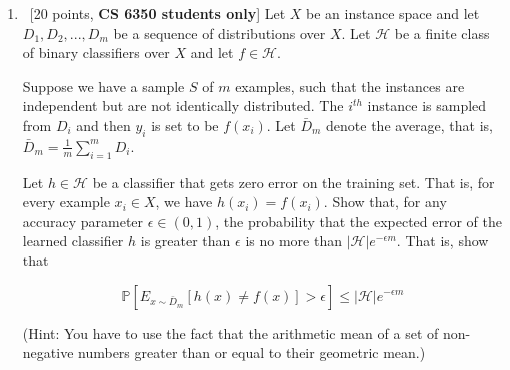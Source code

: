 \begin{enumerate}
\item ~[20 points, {\bf CS 6350 students only}] Let $X$ be an instance
  space and let $D_1,D_2,...,D_m$ be a sequence of distributions over
  $X$. Let $\mathcal{H}$ be a finite class of binary classifiers over
  $X$ and let $f\in \mathcal{H}$. 

  Suppose we have a sample $S$ of $m$ examples, such that the
  instances are independent but are not identically distributed. The
  $i^{th}$ instance is sampled from $D_i$ and then $y_i$ is set to be
  $f(x_i)$. Let $\bar{D}_m$ denote the average, that is,
  $\bar{D}_m = \frac{1}{m}\sum_{i=1}^m D_i$. 

  Let $h \in \mathcal{H}$ be a classifier that gets zero error on the
  training set. That is, for every example $x_i \in X$, we have
  $h(x_i) = f(x_i)$. Show that, for any accuracy parameter
  $\epsilon \in (0, 1)$, the probability that the expected error of
  the learned classifier $h$ is greater than $\epsilon$ is no more
  than $|\mathcal{H}|e^{-\epsilon m}$. That is, show that

  \[\mathbb{P}\left[E_{x \sim \bar{D}_m}\left[h(x) \ne f(x)\right]> \epsilon\right] \leq  |\mathcal{H}|e^{-\epsilon m}\]

  (Hint: You have to use the fact that the arithmetic mean of a set of
  non-negative numbers greater than or equal to their geometric mean.)


\end{enumerate}
